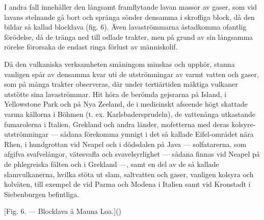 \documentclass[a4paper, 12pt, oneside, swedish]{article}
\begin{document}
I andra fall innehåller den långsamt framflytande lavan massor av gaser, som vid lavans stelnande gå bort och spränga sönder densamma i skrofliga block, då den bildar så kallad blocklava (fig. 6). Även lavaströmmarna åstadkomma ofantlig förödelse, då de tränga ned till odlade trakter, men på grund av sin långsamma rörelse förorsaka de endast ringa förlust av människolif.

Då den vulkaniska verksamheten småningom minskas och upphör, stanna vanligen spår av densamma kvar uti de utströmningar av varmt vatten och gaser, som på många trakter observeras, där under tertiärtiden mäktiga vulkaner utstötte sina lavaströmmar. Hit höra de berömda gejsrarna på Island, i Yellowstone Park och på Nya Zeeland, de i medicinskt afseende högt skattade varma källorna i Böhmen (t. ex. Karlsbadersprudeln), de vattenånga utkastande fumarolerna i Italien, Grekland och andra länder, mofetterna med deras kolsyre-utströmningar --- sådana förekomma ymnigt i det så kallade Eifel-området nära Rhen, i hundgrottan vid Neapel och i dödsdalen på Java --- solfatarerna, som afgifva svafvelångor, vätesvafla och svavelsyrlighet --- sådana finnas vid Neapel på de phlegreiska fälten och i Grekland ---, samt en del av de så kallade slamvulkanerna, hvilka stöta ut slam, saltvatten och gaser, vanligen kolsyra och kolväten, till exempel de vid Parma och Modena i Italien samt vid Kronstadt i Siebenburgen befintliga.

[Fig. 6. --- Blocklava å Mauna Loa.]()
\end{document}
